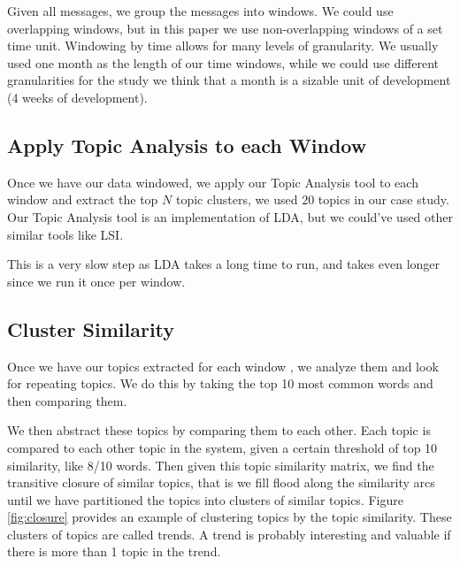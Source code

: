 \documentclass[times, 10pt,twocolumn]{article}
\begin{document}
Given all messages, we group the messages into windows. We could use
overlapping windows, but in this paper we use non-overlapping windows
of a set time unit.  Windowing by time allows for many levels of
granularity. We usually used one month as the length of our time
windows, while we could use different granularities for the study we
think that a month is a sizable unit of development (4 weeks of
development).


\subsection{Apply Topic Analysis to each Window}

Once we have our data windowed, we apply our Topic Analysis tool to
each window and extract the top $N$ topic clusters, we used $20$
topics in our case study. Our Topic Analysis tool is an implementation
of LDA, but we could've used other similar tools like LSI.

This is a very slow step as LDA takes a long time to run, and takes
even longer since we run it once per window.





\subsection{Cluster Similarity}


Once we have our topics extracted for each window , we analyze them
and look for repeating topics. We do this by taking the top 10 most
common words and then comparing them. 

We then abstract these topics by comparing them to each other.  Each
topic is compared to each other topic in the system, given a certain
threshold of top 10 similarity, like 8/10 words. Then given this topic
similarity matrix, we find the transitive closure of similar topics,
that is we fill flood along the similarity arcs until we have
partitioned the topics into clusters of similar topics. Figure
\ref{fig:closure} provides an example of clustering topics by the
topic similarity. These clusters of topics are called trends. A trend
is probably interesting and valuable if there is more than 1 topic in
the trend.
\end{document}
